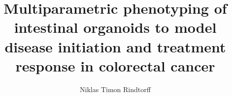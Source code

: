 \title{Multiparametric phenotyping of intestinal organoids to model disease initiation and treatment response in colorectal cancer}
\author{Niklas Timon Rindtorff}

\degree{} %
\field{} %

